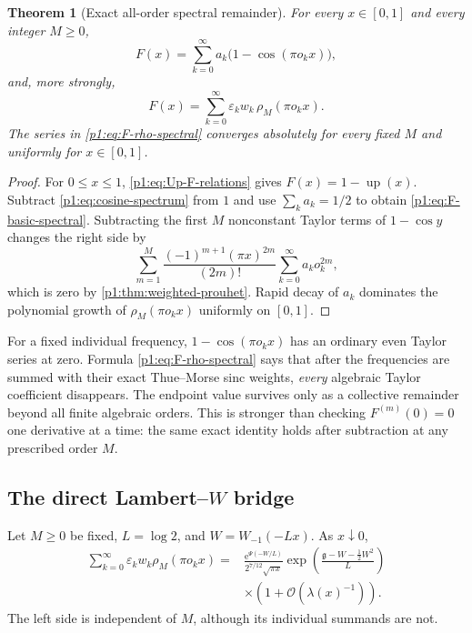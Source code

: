 \documentclass[11pt,oneside]{article}
\newtheorem{theorem}{Theorem}[section]
\theoremstyle{definition}
\theoremstyle{remark}
\newcommand{\Up}{\operatorname{up}}
\newcommand{\e}{\mathrm e}
\newcommand{\bigO}{\mathcal O}
\newcommand{\eps}{\varepsilon}
\begin{document}
\begin{theorem}[Exact all-order spectral remainder]\label{p1:thm:spectral-remainder}
For every $x\in[0,1]$ and every integer $M\ge0$,
\begin{equation}\label{p1:eq:F-basic-spectral}
 F(x)=\sum_{k=0}^{\infty}a_k
 \bigl(1-\cos(\pi o_kx)\bigr),
\end{equation}
and, more strongly,
\begin{equation}\label{p1:eq:F-rho-spectral}
 \boxed{
 F(x)=\sum_{k=0}^{\infty}\eps_kw_k\,
 \rho_M(\pi o_kx).}
\end{equation}
The series in \eqref{p1:eq:F-rho-spectral} converges absolutely for every fixed
$M$ and uniformly for $x\in[0,1]$.
\end{theorem}

\begin{proof}
For $0\le x\le1$, \eqref{p1:eq:Up-F-relations} gives
$F(x)=1-\Up(x)$.  Subtract \eqref{p1:eq:cosine-spectrum} from $1$ and use
$\sum_ka_k=1/2$ to obtain \eqref{p1:eq:F-basic-spectral}.  Subtracting the first
$M$ nonconstant Taylor terms of $1-\cos y$ changes the right side by
\[
 \sum_{m=1}^{M}\frac{(-1)^{m+1}(\pi x)^{2m}}{(2m)!}
 \sum_{k=0}^{\infty}a_ko_k^{2m},
\]
which is zero by \cref{p1:thm:weighted-prouhet}.  Rapid decay of $a_k$ dominates
the polynomial growth of $\rho_M(\pi o_kx)$ uniformly on $[0,1]$.
\end{proof}

\begin{remark}
For a fixed individual frequency, $1-\cos(\pi o_kx)$ has an ordinary even
Taylor series at zero.  Formula \eqref{p1:eq:F-rho-spectral} says that after the
frequencies are summed with their exact Thue--Morse sinc weights, \emph{every}
algebraic Taylor coefficient disappears.  The endpoint value survives only as
a collective remainder beyond all finite algebraic orders.  This is stronger
than checking $F^{(m)}(0)=0$ one derivative at a time: the same exact identity
holds after subtraction at any prescribed order $M$.
\end{remark}

\subsection{The direct Lambert--\texorpdfstring{$W$}{W} bridge}

\begin{corollary}\label{p1:cor:Lambert-spectral-bridge}
Let $M\ge0$ be fixed, $L=\log2$, and
$W=W_{-1}(-Lx)$.  As $x\downarrow0$,
\begin{equation}\label{p1:eq:Lambert-spectral-bridge}
\boxed{
\begin{aligned}
 \sum_{k=0}^{\infty}\eps_kw_k\rho_M(\pi o_kx)
 ={}&\frac{\e^{\Psi(-W/L)}}{2^{7/12}\sqrt{\pi x}}
 \exp\!\left(\frac{\mathfrak g-W-\tfrac12W^2}{L}\right)\\
 &\times\left(1+\bigO\!\left(\lambda(x)^{-1}\right)\right).
\end{aligned}}
\end{equation}
The left side is independent of $M$, although its individual summands are not.
\end{corollary}
\end{document}
